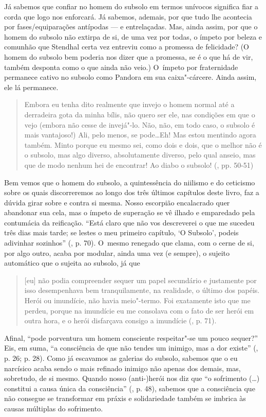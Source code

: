 Já sabemos que confiar no homem do subsolo em termos unívocos significa
fiar a corda que logo nos enforcará. Já sabemos, ademais, por que tudo
lhe acontecia por fases/equiparações antípodas --- e entrelaçadas. Mas,
ainda assim, por que o homem do subsolo não extirpa de si, de uma vez
por todas, o ímpeto por beleza e comunhão que Stendhal certa vez
entreviu como a promessa de felicidade? (O homem do subsolo bem poderia
nos dizer que a promessa, se é o que há de vir, também desponta como o
que ainda não veio.) O~ímpeto por fraternidade permanece cativo no
subsolo como Pandora em sua caixa"-cárcere. Ainda assim, ele lá
permanece.

\begin{quote}
Embora eu tenha dito realmente que invejo o homem normal até a
derradeira gota da minha bílis, não quero ser ele, nas condições em que
o vejo (embora não cesse de invejá"-lo. Não, não, em todo caso, o subsolo
é mais vantajoso!) Ali, pelo menos, se pode\ldots Eh! Mas estou mentindo
agora também. Minto porque eu mesmo sei, como dois e dois, que o melhor
não é o subsolo, mas algo diverso, absolutamente diverso, pelo qual
anseio, mas que de modo nenhum hei de encontrar! Ao diabo o subsolo!
(, pp. 50-51)
\end{quote}

Bem vemos que o homem do subsolo, a quintessência do niilismo e do
ceticismo sobre os quais discorreremos ao longo dos três últimos
capítulos deste livro, faz a dúvida girar sobre e contra si mesma. Nosso
escorpião encalacrado quer abandonar sua cela, mas o ímpeto de superação
se vê ilhado e emparedado pela contumácia da reificação. ``Está claro
que não vos descreverei o que me sucedeu três dias mais tarde; se lestes
o meu primeiro capítulo, `O Subsolo', podeis adivinhar sozinhos'' (,
p. 70). O~mesmo renegado que clama, com o cerne de si, por algo outro,
acaba por modular, ainda uma vez (e sempre), o sujeito automático que o
sujeita ao subsolo, já que

\begin{quote}
{[}eu{]} não podia compreender sequer um papel secundário e justamente
por isso desempenhava bem tranquilamente, na realidade, o último dos
papéis. Herói ou imundície, não havia meio"-termo. Foi exatamente isto
que me perdeu, porque na imundície eu me consolava com o fato de ser
herói em outra hora, e o herói disfarçava consigo a imundície (, p.
71).
\end{quote}

Afinal, ``pode porventura um homem consciente respeitar"-se um pouco
sequer?'' Eis, em suma, ``a consciência de que não tendes um inimigo,
mas a dor existe'' (, p. 26; p. 28). Como já escavamos as galerias
do subsolo, sabemos que o eu narcísico acaba sendo o mais refinado
inimigo não apenas dos demais, mas, sobretudo, de si mesmo. Quando nosso
\mbox{(anti-)herói} nos diz que ``o sofrimento (\ldots) constitui a causa única da
consciência'' (, p. 48), sabemos que a consciência que não consegue
se transformar em práxis e solidariedade também se imbrica às causas
múltiplas do sofrimento.

